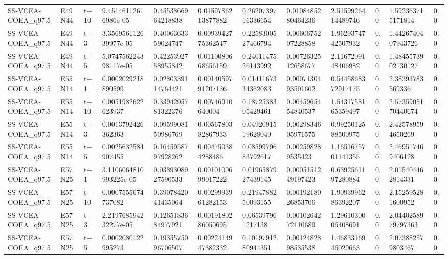 \begin{landscape}
\begin{longtable}{llllllllllll}
SS-VCEA-COEA\_q97.5 & E49N44 & t+10 & 9.45146112616986e-05 & 0.4553866964218838 & 0.0159786213877882 & 0.2620739716336654 & 0.0108485280464236 & 2.5159926414489746 & 0.0 & 1.592363715171814 & 0.0 \\
SS-VCEA-COEA\_q97.5 & E49N44 & t+3 & 3.356956112639977e-05 & 0.4006363359024747 & 0.0093942775362547 & 0.2258300527466794 & 0.0060675207228858 & 1.9629374742507932 & 0.0 & 1.4426740407943726 & 0.0 \\
SS-VCEA-COEA\_q97.5 & E49N44 & t+5 & 5.074756224398117e-05 & 0.4225392758955842 & 0.0110080668656159 & 0.2401147526143992 & 0.0072632512658677 & 2.1167209148406982 & 0.0 & 1.4845573902130127 & 0.0 \\
SS-VCEA-COEA\_q97.5 & E55N14 & t+1 & 0.0002029218890599 & 0.0280339114764421 & 0.0014059791207136 & 0.0141167334362083 & 0.0007130493591602 & 0.5445868372917175 & 0.0 & 2.38393783569336 & 0.0 \\
SS-VCEA-COEA\_q97.5 & E55N14 & t+10 & 0.0051982622623937 & 0.3394295781322376 & 0.00746910640004 & 0.1872538305429461 & 0.0045965454840537 & 1.5431758165359497 & 0.0 & 2.5735905170440674 & 0.0 \\
SS-VCEA-COEA\_q97.5 & E55N14 & t+3 & 0.0013792426362363 & 0.0959908150986769 & 0.0056780382867933 & 0.0492091519628049 & 0.0029834605971575 & 0.9925012588500975 & 0.0 & 2.425789594650269 & 0.0 \\
SS-VCEA-COEA\_q97.5 & E55N14 & t+5 & 0.0025632584907455 & 0.1645958797928262 & 0.004750384288486 & 0.0859979683792617 & 0.002598289535423 & 1.1651675701141355 & 0.0 & 2.469517469406128 & 0.0 \\
SS-VCEA-COEA\_q97.5 & E57N25 & t+1 & 3.1106064810993225e-05 & 0.0389308927590533 & 0.0010100699017222 & 0.0196587927439145 & 0.0005151249197423 & 0.6392561197280884 & 0.0 & 2.015404462814331 & 0.0 \\
SS-VCEA-COEA\_q97.5 & E57N25 & t+10 & 0.0007555674737082 & 0.3907842041435064 & 0.0029993961282153 & 0.2194788250093155 & 0.0019218026853706 & 1.9093996286392207 & 0.0 & 2.152595281600952 & 0.0 \\
SS-VCEA-COEA\_q97.5 & E57N25 & t+3 & 2.219768594232277e-05 & 0.1265183684977921 & 0.0019180286050695 & 0.065397961217138 & 0.0010264272110689 & 1.2961030006408691 & 0.0 & 2.0440258979797363 & 0.0 \\
SS-VCEA-COEA\_q97.5 & E57N25 & t+5 & 0.0002080122995273 & 0.1935575096706507 & 0.0022414947382332 & 0.1019791280944351 & 0.0012482898535538 & 1.4683316946029663 & 0.0 & 2.073882579803467 & 0.0 \\

\end{longtable}
\end{landscape}
